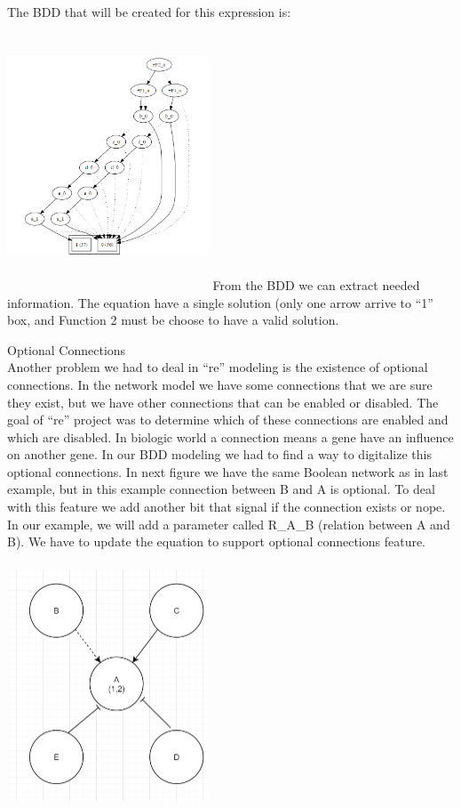 \documentclass{article}      %
\newcounter{ct}
\begin{document}
The BDD that will be created for this expression is:
\includegraphics[width=6cm, height=8cm]{bdd1.png}
From the BDD we can extract needed information. The equation have a single solution (only one arrow arrive to “1” box, and Function 2 must be choose to have a valid solution.



\large Optional Connections \\
Another problem we had to deal in “re” modeling is the existence of optional connections. In the network model we have some connections that we are sure they exist, but we have other connections that can be enabled or disabled. The goal of “re” project was to determine which of these connections are enabled and which are disabled. In biologic world a connection means a gene have an influence on another gene. In our BDD modeling we had to find a way to digitalize this optional connections. In next figure we have the same Boolean network as in last example, but in this example connection between B and A is optional.
To deal with this feature we add another bit that signal if the connection exists or nope. In our example, we will add a parameter called R\_A\_B (relation between A and B). We have to update the equation to support optional connections feature.
\includegraphics[width=6cm, height=8cm]{image11.png}
\end{document}
